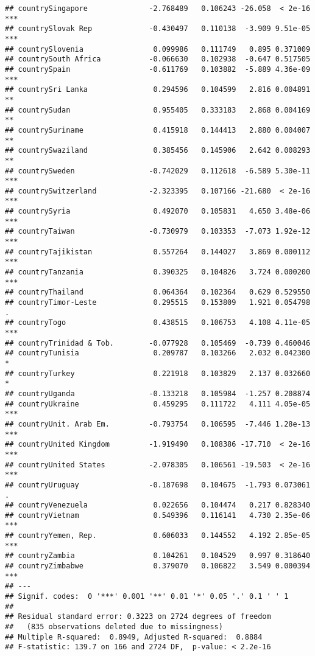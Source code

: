 \documentclass[
  11pt,
]{article}
\begin{document}
\begin{verbatim}
## countrySingapore              -2.768489   0.106243 -26.058  < 2e-16 ***
## countrySlovak Rep             -0.430497   0.110138  -3.909 9.51e-05 ***
## countrySlovenia                0.099986   0.111749   0.895 0.371009    
## countrySouth Africa           -0.066630   0.102938  -0.647 0.517505    
## countrySpain                  -0.611769   0.103882  -5.889 4.36e-09 ***
## countrySri Lanka               0.294596   0.104599   2.816 0.004891 ** 
## countrySudan                   0.955405   0.333183   2.868 0.004169 ** 
## countrySuriname                0.415918   0.144413   2.880 0.004007 ** 
## countrySwaziland               0.385456   0.145906   2.642 0.008293 ** 
## countrySweden                 -0.742029   0.112618  -6.589 5.30e-11 ***
## countrySwitzerland            -2.323395   0.107166 -21.680  < 2e-16 ***
## countrySyria                   0.492070   0.105831   4.650 3.48e-06 ***
## countryTaiwan                 -0.730979   0.103353  -7.073 1.92e-12 ***
## countryTajikistan              0.557264   0.144027   3.869 0.000112 ***
## countryTanzania                0.390325   0.104826   3.724 0.000200 ***
## countryThailand                0.064364   0.102364   0.629 0.529550    
## countryTimor-Leste             0.295515   0.153809   1.921 0.054798 .  
## countryTogo                    0.438515   0.106753   4.108 4.11e-05 ***
## countryTrinidad & Tob.        -0.077928   0.105469  -0.739 0.460046    
## countryTunisia                 0.209787   0.103266   2.032 0.042300 *  
## countryTurkey                  0.221918   0.103829   2.137 0.032660 *  
## countryUganda                 -0.133218   0.105984  -1.257 0.208874    
## countryUkraine                 0.459295   0.111722   4.111 4.05e-05 ***
## countryUnit. Arab Em.         -0.793754   0.106595  -7.446 1.28e-13 ***
## countryUnited Kingdom         -1.919490   0.108386 -17.710  < 2e-16 ***
## countryUnited States          -2.078305   0.106561 -19.503  < 2e-16 ***
## countryUruguay                -0.187698   0.104675  -1.793 0.073061 .  
## countryVenezuela               0.022656   0.104474   0.217 0.828340    
## countryVietnam                 0.549396   0.116141   4.730 2.35e-06 ***
## countryYemen, Rep.             0.606033   0.144552   4.192 2.85e-05 ***
## countryZambia                  0.104261   0.104529   0.997 0.318640    
## countryZimbabwe                0.379070   0.106822   3.549 0.000394 ***
## ---
## Signif. codes:  0 '***' 0.001 '**' 0.01 '*' 0.05 '.' 0.1 ' ' 1
## 
## Residual standard error: 0.3223 on 2724 degrees of freedom
##   (835 observations deleted due to missingness)
## Multiple R-squared:  0.8949, Adjusted R-squared:  0.8884 
## F-statistic: 139.7 on 166 and 2724 DF,  p-value: < 2.2e-16
\end{verbatim}
\end{document}
